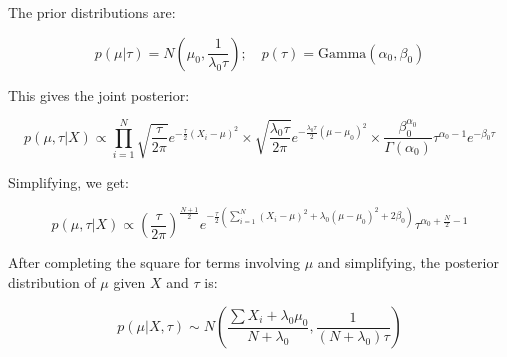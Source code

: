 \documentclass{article}
\begin{document}
\begin{multicols}{2}
    The prior distributions are:

    \begin{equation}
    p(\mu | \tau) = N(\mu_0, \frac{1}{\lambda_0 \tau}); \quad p(\tau) = \mathrm{Gamma}(\alpha_0, \beta_0)
    \end{equation}


    This gives the joint posterior:

    \begin{equation}
    p(\mu, \tau | X) \propto \prod_{i=1}^{N} \sqrt{\frac{\tau}{2 \pi}} e^{-\frac{\tau}{2} (X_i - \mu)^2} \times \sqrt{\frac{\lambda_0 \tau}{2 \pi}} e^{-\frac{\lambda_0 \tau}{2} (\mu - \mu_0)^2} \times \frac{\beta_0^{\alpha_0}}{\Gamma(\alpha_0)} \tau^{\alpha_0 - 1} e^{-\beta_0 \tau}
    \end{equation}

    Simplifying, we get:

    \begin{equation}
    p(\mu, \tau | X) \propto \left(\frac{\tau}{2 \pi}\right)^{\frac{N+1}{2}} e^{-\frac{\tau}{2} \left(\sum_{i=1}^{N} (X_i - \mu)^2 + \lambda_0 (\mu - \mu_0)^2 + 2 \beta_0 \right)} \tau^{\alpha_0 + \frac{N}{2} - 1}
    \end{equation}


    After completing the square for terms involving \( \mu \) and simplifying, the posterior distribution of \( \mu \) given \( X \) and \( \tau \) is:

    \begin{equation}
    p(\mu | X, \tau) \sim N\left(\frac{\sum X_i + \lambda_0 \mu_0}{N + \lambda_0}, \frac{1}{(N + \lambda_0) \tau}\right)
    \end{equation}




\end{multicols}
\clearpage
{}
\printbibliography{}
\end{document}
